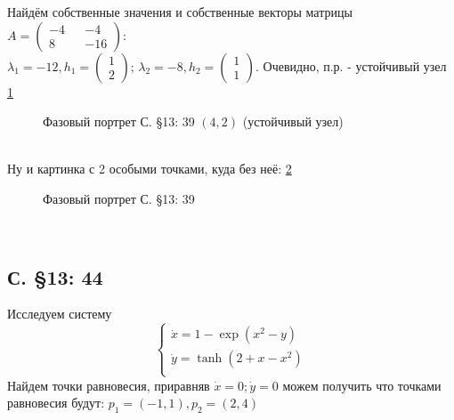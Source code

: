 \documentclass{article}
\begin{document}
Найдём собственные значения и собственные векторы матрицы $A=\begin{pmatrix} -4 && -4 \\ 8 && -16 \end{pmatrix}$:\\
 $\lambda_1=-12,
 h_1 = \begin{pmatrix} 1 \\  2 \end{pmatrix} $; 
 $\lambda_2= -8,
 h_2 = \begin{pmatrix} 1 \\  1 \end{pmatrix} $. 
 Очевидно, п.р. - устойчивый узел \ref{13.39.2}
 \begin{figure}[ht]
\caption{Фазовый портрет С. \S13: 39 $(4,2)$ (устойчивый узел)}
\label{13.39.2}
\end{figure}\\  
Ну и картинка с 2 особыми точками, куда без неё: \ref{13.39.3}\\
 \begin{figure}[ht]
\caption{Фазовый портрет С. \S13: 39}
\label{13.39.3}
\end{figure}\\

\subsection{С. \S13: 44}
Исследуем систему 
\begin{equation}
\begin{cases}
        \dot{x}=1-\exp{(x^2-y)}\\
        \dot{y}=\tanh{(2+x-x^2)}\\
    \end{cases}    
\end{equation}
Найдем точки равновесия, приравняв $\dot{x}=0; \dot{y}=0$ можем получить что точками равновесия будут: $p_1=(-1,1), p_2=(2,4)$\\
\end{document}
